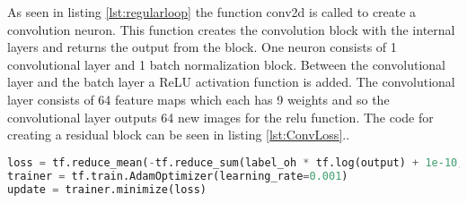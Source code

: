 As seen in listing \ref{lst:regularloop} the function conv2d is called to create a convolution neuron. This function creates the convolution block with the internal layers and returns the output from the block. One neuron consists of 1 convolutional layer and 1 batch normalization block. Between the convolutional layer and the batch layer a ReLU activation function is added. The convolutional layer consists of 64 feature maps which each has 9 weights and so the convolutional layer outputs 64 new images for the relu function. The code for creating a residual block can be seen in listing \ref{lst:ConvLoss}..

\begin{lstlisting}[language=Python, label=lst:ConvLoss, caption= Implementation of learning rate type ADAM]
loss = tf.reduce_mean(-tf.reduce_sum(label_oh * tf.log(output) + 1e-10, axis=[1]))
trainer = tf.train.AdamOptimizer(learning_rate=0.001)
update = trainer.minimize(loss)
\end{lstlisting}